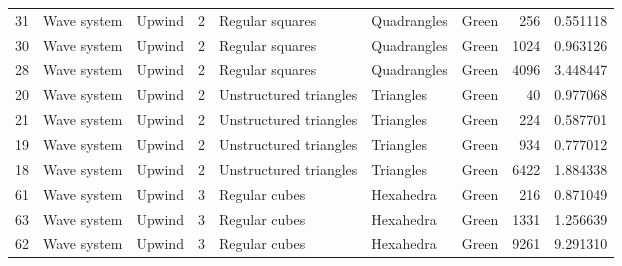 \begin{tabular}{lllrlllrr}
31  &       Wave system &                         Upwind &               2 &                 Regular squares &            Quadrangles  &                                Green &                      256 &                         0.551118 \\
30  &       Wave system &                         Upwind &               2 &                 Regular squares &            Quadrangles  &                                Green &                     1024 &                         0.963126 \\
28  &       Wave system &                         Upwind &               2 &                 Regular squares &            Quadrangles  &                                Green &                     4096 &                         3.448447 \\
20  &       Wave system &                         Upwind &               2 &          Unstructured triangles &              Triangles  &                                Green &                       40 &                         0.977068 \\
21  &       Wave system &                         Upwind &               2 &          Unstructured triangles &              Triangles  &                                Green &                      224 &                         0.587701 \\
19  &       Wave system &                         Upwind &               2 &          Unstructured triangles &              Triangles  &                                Green &                      934 &                         0.777012 \\
18  &       Wave system &                         Upwind &               2 &          Unstructured triangles &              Triangles  &                                Green &                     6422 &                         1.884338 \\
61  &       Wave system &                         Upwind &               3 &                   Regular cubes &              Hexahedra  &                                Green &                      216 &                         0.871049 \\
63  &       Wave system &                         Upwind &               3 &                   Regular cubes &              Hexahedra  &                                Green &                     1331 &                         1.256639 \\
62  &       Wave system &                         Upwind &               3 &                   Regular cubes &              Hexahedra  &                                Green &                     9261 &                         9.291310 \\

\end{tabular}
